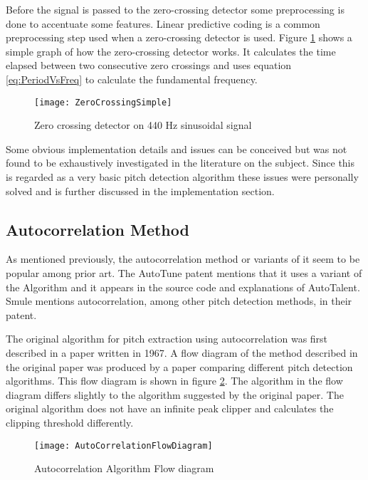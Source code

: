 Before the signal is passed to the zero-crossing detector some preprocessing is
done to accentuate some features. Linear predictive coding is a common
preprocessing step used when a zero-crossing detector is used\cite{PDABook}.
Figure \ref{fig:ZeroCrossing} shows a simple graph of how the zero-crossing
detector works. It calculates the time elapsed between two consecutive zero
crossings and uses equation \ref{eq:PeriodVsFreq} to calculate the fundamental frequency.

\begin{figure}[h]
	\texttt{[image: ZeroCrossingSimple]}
	\caption{Zero crossing detector on 440 Hz sinusoidal signal}
	\label{fig:ZeroCrossing}
\end{figure}

Some obvious implementation details and issues can be conceived but was not found
to be exhaustively investigated in the literature on the subject. Since this is
regarded as a very basic pitch detection algorithm these issues were personally
solved and is further discussed in the implementation section.

\subsection{Autocorrelation Method}

As mentioned previously, the autocorrelation method or variants of it seem to be
popular among prior art. The AutoTune patent\cite{AutoTunePatent} mentions that it
uses a variant of the Algorithm and it appears in the source code and explanations
of AutoTalent\cite{AutoTalent}. Smule mentions autocorrelation, among other pitch
detection methods, in their patent\cite{SmulePatent}.

The original algorithm for pitch extraction using autocorrelation was first
described in a paper written in 1967\cite{OriginalAutocorrelation}. A flow
diagram of the method described in the original paper was produced by a paper
comparing different pitch detection algorithms\cite{ComparitivePitch}. This flow
diagram is shown in figure \ref{fig:AutoCorrelationFlowDiagram}. The algorithm in
the flow diagram differs slightly to the algorithm suggested by the original
paper. The original algorithm does not have an infinite peak clipper and
calculates the clipping threshold differently.

\begin{figure}[h]
	\texttt{[image: AutoCorrelationFlowDiagram]}
	\caption{Autocorrelation Algorithm Flow diagram\cite{ComparitivePitch}}
	\label{fig:AutoCorrelationFlowDiagram}
\end{figure}


